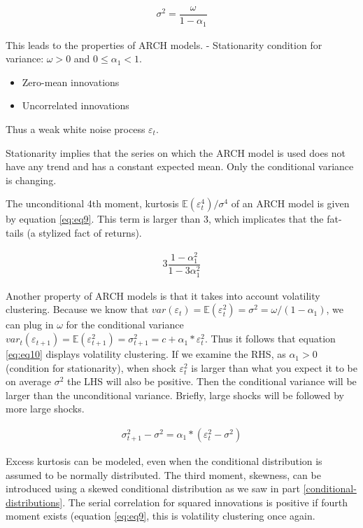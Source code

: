 \documentclass[a4paper, twoside]{templates/ociamthesis}
\begin{document}
\begin{align} 
\sigma^2 = \dfrac{\omega}{1-\alpha_1}
 \label{eq:eq8}
\end{align}

\newpage

\noindent This leads to the properties of ARCH models. - Stationarity condition for variance: \(\omega>0\) and \(0 \le \alpha_1 < 1\).

\begin{itemize}
\item
  Zero-mean innovations
\item
  Uncorrelated innovations
\end{itemize}

\noindent Thus a weak white noise process \(\varepsilon_t\).

\noindent Stationarity implies that the series on which the ARCH model is used does not have any trend and has a constant expected mean. Only the conditional variance is changing.

\noindent The unconditional 4th moment, kurtosis \(\mathbb{E}(\varepsilon_t^4)/\sigma^4\) of an ARCH model is given by equation \eqref{eq:eq9}. This term is larger than 3, which implicates that the fat-tails (a stylized fact of returns).

\begin{align} 
3\dfrac{1-\alpha_1^2}{1-3\alpha_1^2}
 \label{eq:eq9}
\end{align}

\noindent Another property of ARCH models is that it takes into account volatility clustering. Because we know that \(var(\varepsilon_t) = \mathbb{E}(\varepsilon_t^2) = \sigma^2 = \omega/(1-\alpha_1)\), we can plug in \(\omega\) for the conditional variance \(var_t(\varepsilon_{t+1}) = \mathbb{E}(\varepsilon_{t+1}^2) = \sigma_{t+1}^2 = c + \alpha_1*\varepsilon_t^2\). Thus it follows that equation \eqref{eq:eq10} displays volatility clustering. If we examine the RHS, as \(\alpha_1>0\) (condition for stationarity), when shock \(\varepsilon_t^2\) is larger than what you expect it to be on average \(\sigma^2\) the LHS will also be positive. Then the conditional variance will be larger than the unconditional variance. Briefly, large shocks will be followed by more large shocks.

\begin{align} 
\sigma_{t+1}^2 - \sigma^2 = \alpha_1*(\varepsilon_t^2 - \sigma^2)
 \label{eq:eq10}
\end{align}

\noindent Excess kurtosis can be modeled, even when the conditional distribution is assumed to be normally distributed. The third moment, skewness, can be introduced using a skewed conditional distribution as we saw in part \ref{conditional-distributions}. The serial correlation for squared innovations is positive if fourth moment exists (equation \eqref{eq:eq9}, this is volatility clustering once again.
\end{document}

